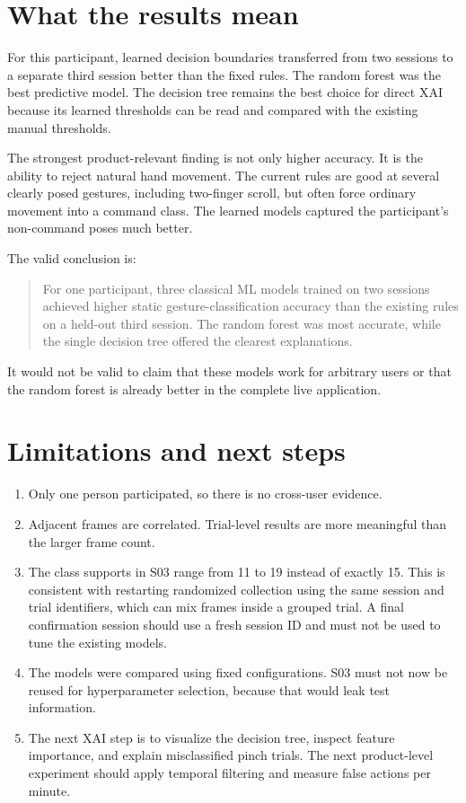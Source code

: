 \documentclass[11pt,a4paper]{article}
\begin{document}
\section{What the results mean}

For this participant, learned decision boundaries transferred from two sessions
to a separate third session better than the fixed rules. The random forest was
the best predictive model. The decision tree remains the best choice for direct
XAI because its learned thresholds can be read and compared with the existing
manual thresholds.

The strongest product-relevant finding is not only higher accuracy. It is the
ability to reject natural hand movement. The current rules are good at several
clearly posed gestures, including two-finger scroll, but often force ordinary
movement into a command class. The learned models captured the participant's
non-command poses much better.

The valid conclusion is:

\begin{quote}
For one participant, three classical ML models trained on two sessions achieved
higher static gesture-classification accuracy than the existing rules on a
held-out third session. The random forest was most accurate, while the single
decision tree offered the clearest explanations.
\end{quote}

It would not be valid to claim that these models work for arbitrary users or
that the random forest is already better in the complete live application.

\section{Limitations and next steps}

\begin{enumerate}
  \item Only one person participated, so there is no cross-user evidence.

  \item Adjacent frames are correlated. Trial-level results are more meaningful
  than the larger frame count.

  \item The class supports in S03 range from 11 to 19 instead of exactly 15.
  This is consistent with restarting randomized collection using the same
  session and trial identifiers, which can mix frames inside a grouped trial.
  A final confirmation session should use a fresh session ID and must not be
  used to tune the existing models.

  \item The models were compared using fixed configurations. S03 must not now be
  reused for hyperparameter selection, because that would leak test information.

  \item The next XAI step is to visualize the decision tree, inspect feature
  importance, and explain misclassified pinch trials. The next product-level
  experiment should apply temporal filtering and measure false actions per
  minute.
\end{enumerate}
\end{document}

